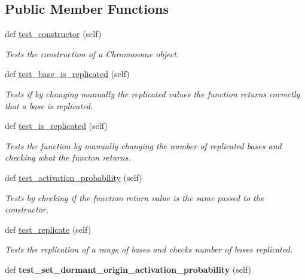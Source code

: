 \subsection*{Public Member Functions}
\begin{DoxyCompactItemize}
\item 
def \mbox{\hyperlink{classReDyMo_1_1test_1_1test__chromosome_1_1TestChromosome_a1399201440b0c37de8d1b6fce870f57b}{test\+\_\+constructor}} (self)
\begin{DoxyCompactList}\small\item\em Tests the construction of a Chromosome object. \end{DoxyCompactList}\item 
def \mbox{\hyperlink{classReDyMo_1_1test_1_1test__chromosome_1_1TestChromosome_af729347cc1469bd0043cdba714f4f04c}{test\+\_\+base\+\_\+is\+\_\+replicated}} (self)
\begin{DoxyCompactList}\small\item\em Tests if by changing manually the replicated values the function returns correctly that a base is replicated. \end{DoxyCompactList}\item 
def \mbox{\hyperlink{classReDyMo_1_1test_1_1test__chromosome_1_1TestChromosome_a4a34ea90fad85adb3f9bbb1dbc4753dc}{test\+\_\+is\+\_\+replicated}} (self)
\begin{DoxyCompactList}\small\item\em Tests the function by manually changing the number of replicated bases and checking what the functon returns. \end{DoxyCompactList}\item 
def \mbox{\hyperlink{classReDyMo_1_1test_1_1test__chromosome_1_1TestChromosome_a016230d72ebca018818839d90460608c}{test\+\_\+activation\+\_\+probability}} (self)
\begin{DoxyCompactList}\small\item\em Tests by checking if the function return value is the same passed to the constructor. \end{DoxyCompactList}\item 
def \mbox{\hyperlink{classReDyMo_1_1test_1_1test__chromosome_1_1TestChromosome_a22ef06b4ce026761f08ffb7bfca2809a}{test\+\_\+replicate}} (self)
\begin{DoxyCompactList}\small\item\em Tests the replication of a range of bases and checks number of bases replicated. \end{DoxyCompactList}\item 
\mbox{\label{classReDyMo_1_1test_1_1test__chromosome_1_1TestChromosome_a7e91e79150e4610a3f019333b8bf322a}} 
def {\bfseries test\+\_\+set\+\_\+dormant\+\_\+origin\+\_\+activation\+\_\+probability} (self)
\end{DoxyCompactItemize}


